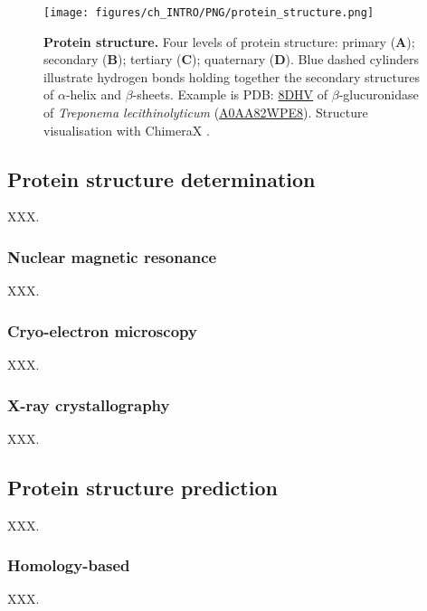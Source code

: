 \begin{figure}[htb!]
    \centering
    \texttt{[image: figures/ch\_INTRO/PNG/protein\_structure.png]}
    \caption[Protein structure]{\textbf{Protein structure.} Four levels of protein structure: primary (\textbf{A}); secondary (\textbf{B}); tertiary (\textbf{C}); quaternary (\textbf{D}). Blue dashed cylinders illustrate hydrogen bonds holding together the secondary structures of $\alpha$-helix and $\beta$-sheets. Example is PDB: \href{https://www.ebi.ac.uk/pdbe/entry/pdb/8dhv}{8DHV} \cite{LIETZAN_2023_BETAGLUCO} of $\beta$-glucuronidase of \textit{Treponema lecithinolyticum} (\href{https://www.uniprot.org/uniprotkb/A0AA82WPE8/entry}{A0AA82WPE8}). Structure visualisation with ChimeraX \cite{PETTERSEN_2021_CHIMERAX}.}
    \label{fig:protein_structure}
\end{figure}

\subsection{Protein structure determination}

XXX.

\subsubsection{Nuclear magnetic resonance}

XXX.

\subsubsection{Cryo-electron microscopy}

XXX.

\subsubsection{X-ray crystallography}

XXX.

\subsection{Protein structure prediction}

XXX.

\subsubsection{Homology-based}

XXX.

